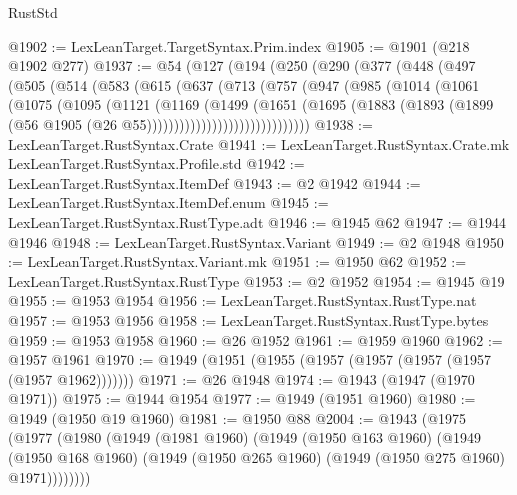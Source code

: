\begin{lexlean}{RustStd}
\begin{coremodule}
@1902 := LexLeanTarget.TargetSyntax.Prim.index
@1905 := @1901 (@218 @1902 @277)
@1937 := @54
    (@127
      (@194
        (@250
          (@290
            (@377
              (@448
                (@497
                  (@505
                    (@514
                      (@583
                        (@615
                          (@637
                            (@713
                              (@757
                                (@947
                                  (@985
                                    (@1014
                                      (@1061
                                        (@1075
                                          (@1095
                                            (@1121
                                              (@1169
                                                (@1499
                                                  (@1651
                                                    (@1695
                                                      (@1883
                                                        (@1893
                                                          (@1899
                                                            (@56
                                                              @1905
                                                              (@26 @55))))))))))))))))))))))))))))))
@1938 := LexLeanTarget.RustSyntax.Crate
@1941 := LexLeanTarget.RustSyntax.Crate.mk LexLeanTarget.RustSyntax.Profile.std
@1942 := LexLeanTarget.RustSyntax.ItemDef
@1943 := @2 @1942
@1944 := LexLeanTarget.RustSyntax.ItemDef.enum
@1945 := LexLeanTarget.RustSyntax.RustType.adt
@1946 := @1945 @62
@1947 := @1944 @1946
@1948 := LexLeanTarget.RustSyntax.Variant
@1949 := @2 @1948
@1950 := LexLeanTarget.RustSyntax.Variant.mk
@1951 := @1950 @62
@1952 := LexLeanTarget.RustSyntax.RustType
@1953 := @2 @1952
@1954 := @1945 @19
@1955 := @1953 @1954
@1956 := LexLeanTarget.RustSyntax.RustType.nat
@1957 := @1953 @1956
@1958 := LexLeanTarget.RustSyntax.RustType.bytes
@1959 := @1953 @1958
@1960 := @26 @1952
@1961 := @1959 @1960
@1962 := @1957 @1961
@1970 := @1949 (@1951 (@1955 (@1957 (@1957 (@1957 (@1957 (@1957 @1962)))))))
@1971 := @26 @1948
@1974 := @1943 (@1947 (@1970 @1971))
@1975 := @1944 @1954
@1977 := @1949 (@1951 @1960)
@1980 := @1949 (@1950 @19 @1960)
@1981 := @1950 @88
@2004 := @1943
    (@1975
      (@1977
        (@1980
          (@1949
            (@1981 @1960)
            (@1949
              (@1950 @163 @1960)
              (@1949
                (@1950 @168 @1960)
                (@1949 (@1950 @265 @1960) (@1949 (@1950 @275 @1960) @1971))))))))

\end{coremodule}
\end{lexlean}
